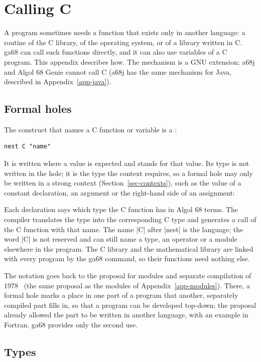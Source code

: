 \chapter{Calling C}\label{app-nest}

A program sometimes needs a function that exists only in another
language: a routine of the C library, of the operating system, or of a
library written in C. ga68 can call such functions directly, and it can
also use variables of a C program. This appendix describes how. The
mechanism is a GNU extension; a68j and Algol 68 Genie cannot call C
(a68j has the same mechanism for Java, described in
Appendix~\ref{app-java}).

\section*{Formal holes}

The construct that names a C function or variable is a :
\begin{lstlisting}
nest C "name"
\end{lstlisting}
It is written where a value is expected and stands for that value. Its
type is not written in the hole; it is the type the context requires, so
a formal hole may only be written in a strong context
(Section~\ref{sec-contexts}), such as the value of a constant
declaration, an argument or the right-hand side of an assignment:


\noindent Each declaration says which type the C function has in Algol 68
terms. The compiler translates the type into the corresponding C type
and generates a call of the C function with that name. The name
\code|C| after \code|nest| is the language; the word \code|C| is not
reserved and can still name a type, an operator or a module elsewhere in
the program. The C library and the mathematical library are linked with
every program by the ga68 command, so their functions need nothing
else.

The notation goes back to the proposal for modules and separate
compilation of 1978~\cite{modules} (the same proposal as the modules of
Appendix~\ref{app-modules}). There, a formal hole marks a place in one
part of a program that another, separately compiled part fills in, so
that a program can be developed top-down; the proposal already allowed
the part to be written in another language, with an example in Fortran.
ga68 provides only the second use.

\section*{Types}

